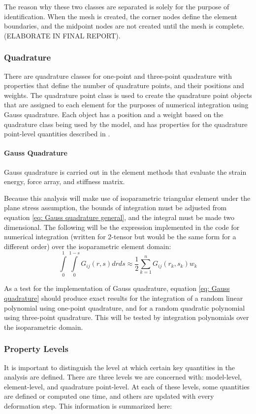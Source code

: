 \documentclass[]{spie}  %
\begin{document}
The reason why these two classes are separated is solely for the purpose of identification. When the mesh is created, the corner nodes define the element boundaries, and the midpoint nodes are not created until the mesh is complete. (ELABORATE IN FINAL REPORT). 

\subsubsection{Quadrature}
\label{sec: quadrature}
There are quadrature classes for one-point and three-point quadrature with properties that define the number of quadrature points, and their positions and weights. The quadrature point class is used to create the quadrature point objects that are assigned to each element for the purposes of numerical integration using Gauss quadrature. Each object has a position and a weight based on the quadrature class being used by the model, and has properties for the quadrature point-level quantities described in \textit{}. 

\paragraph{Gauss Quadrature}
Gauss quadrature is carried out in the element methods that evaluate the strain energy, force array, and stiffness matrix.

Because this analysis will make use of isoparametric triangular element under the plane stress assumption, the bounds of integration must be adjusted from equation \ref{eq: Gauss quadrature general}, and the integral must be made two dimensional. The following will be the expression implemented in the code for numerical integration (written for 2-tensor but would be the same form for a different order) over the isoparametric element domain:
\begin{equation}
\label{eq: Gauss quadrature}
\int\limits_{0}^{1} \int\limits_{0}^{1-s} G_{ij}(r,s)dr ds \approx \frac{1}{2} \sum\limits_{k=1}^{n} G_{ij}(r_k,s_k) w_k
\end{equation}

As a test for the implementation of Gauss quadrature, equation \ref{eq: Gauss quadrature} should produce exact results for the integration of a random linear polynomial using one-point quadrature, and for a random quadratic polynomial using three-point quadrature. This will be tested by integration polynomials over the isoparametric domain. 

\subsubsection{Property Levels}
\label{sec: property levels}
It is important to distinguish the level at which certain key quantities in the analysis are defined. There are three levels we are concerned with: model-level, element-level, and quadrature point-level. At each of these levels, some quantities are defined or computed one time, and others are updated with every deformation step. This information is summarized here:
\end{document}
